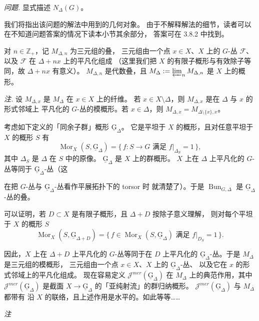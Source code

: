 \emph{问题.} 显式描述 $N_\Delta(G)$。

我们将指出该问题的解法中用到的几何对象。
由于不解释解法的细节，读者可以在不知道问题答案的情况下读本小节其余部分，
答案可在 3.8.2 中找到。

对 $n\in\mathbb{Z}_+$，记 $M_{\Delta,n}$ 为三元组的叠，
三元组由一个点 $x\in X$、$X$ 上的 $G$-丛 $\mathcal{F}$、
以及 $\mathcal{F}$ 在 $\Delta+nx$ 上的平凡化组成
（这里我们把 $X$ 的有限子概形与有效除子等同，故 $\Delta+nx$ 有意义）。
$M_{\Delta,n}$ 是代数叠，且
$M_\Delta:=\varprojlim_n M_{\Delta,n}$ 是 $X$ 上的概形。

\emph{注.} 设 $M_{\Delta,x}$ 是 $M_\Delta$ 在 $x\in X$ 上的纤维。
若 $x\in X\setminus\Delta$，则 $M_{\Delta,x}$ 是在 $\Delta$ 与 $x$ 的形式邻域上
平凡化的 $G$-丛的模概形。若 $x\in\Delta$，则
$M_{\Delta,x}=M_{\Delta\setminus\{x\},x}$。

考虑如下定义的「同余子群」概形 $\underline{\mathrm{G}}_\Delta$。
它是平坦于 $X$ 的概形，且对任意平坦于 $X$ 的概形 $S$ 有
\[
  \operatorname{Mor}_X(S,\underline{\mathrm{G}}_\Delta)
  =\{\,f:S\to G \text{ 满足 } f|_{\Delta_S}=1\,\},
\]
其中 $\Delta_S$ 是 $\Delta$ 在 $S$ 中的原像。
$\underline{\mathrm{G}}_\Delta$ 是 $X$ 上的群概形。
$X$ 上在 $\Delta$ 上平凡化的 $G$-丛等同于
$\underline{\mathrm{G}}_\Delta$-丛（这


在把 $G$-丛与 $\underline{\mathrm{G}}_\Delta$-丛看作平展拓扑下的 torsor 时
就清楚了）。于是 $\operatorname{Bun}_{G,\Delta}$ 是
$\underline{\mathrm{G}}_\Delta$-丛的叠。

可以证明，若 $D\subset X$ 是有限子概形，且 $\Delta+D$ 按除子意义理解，
则对每个平坦于 $X$ 的概形 $S$
\[
  \operatorname{Mor}_X(S,\underline{\mathrm{G}}_{\Delta+D})
  =\{\,f\in\operatorname{Mor}_X(S,\underline{\mathrm{G}}_\Delta)
  \text{ 满足 } f|_{D_S}=1\,\}.
\]

因此，$X$ 上在 $\Delta+D$ 上平凡化的 $G$-丛等同于在 $D$ 上平凡化的
$\underline{\mathrm{G}}_\Delta$-丛。于是 $M_\Delta$ 是三元组的模概形，
三元组由一个点 $x\in X$、$X$ 上的 $\underline{\mathrm{G}}_\Delta$-丛、
以及它在 $x$ 的形式邻域上的平凡化组成。
现在容易定义 $\mathcal{J}^{mer}(\underline{\mathrm{G}}_\Delta)$
在 $M_\Delta$ 上的典范作用，其中
$\mathcal{J}^{mer}(\underline{\mathrm{G}}_\Delta)$ 是截面
$X\to\underline{\mathrm{G}}_\Delta$ 的「亚纯射流」的群归纳概形。
$\mathcal{J}^{mer}(\underline{\mathrm{G}}_\Delta)$ 与 $M_\Delta$ 都带有
沿 $X$ 的联络，且上述作用是水平的。如此等等……

\emph{注}

